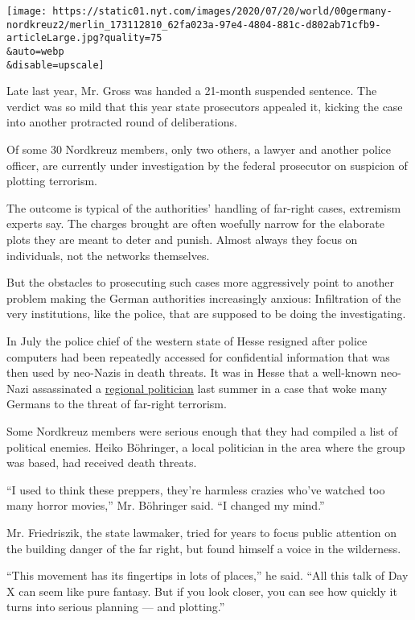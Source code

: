 \texttt{[image: https://static01.nyt.com/images/2020/07/20/world/00germany-nordkreuz2/merlin\_173112810\_62fa023a-97e4-4804-881c-d802ab71cfb9-articleLarge.jpg?quality=75\\\&auto=webp\\\&disable=upscale]}

Late last year, Mr. Gross was handed a 21-month suspended sentence. The
verdict was so mild that this year state prosecutors appealed it,
kicking the case into another protracted round of deliberations.

Of some 30 Nordkreuz members, only two others, a lawyer and another
police officer, are currently under investigation by the federal
prosecutor on suspicion of plotting terrorism.

The outcome is typical of the authorities' handling of far-right cases,
extremism experts say. The charges brought are often woefully narrow for
the elaborate plots they are meant to deter and punish. Almost always
they focus on individuals, not the networks themselves.

But the obstacles to prosecuting such cases more aggressively point to
another problem making the German authorities increasingly anxious:
Infiltration of the very institutions, like the police, that are
supposed to be doing the investigating.

In July the police chief of the western state of Hesse resigned after
police computers had been repeatedly accessed for confidential
information that was then used by neo-Nazis in death threats. It was in
Hesse that a well-known neo-Nazi assassinated a
\href{https://www.nytimes.com/2019/06/26/world/europe/germany-walter-lubcke-neo-nazi.html?searchResultPosition=8}{regional
politician} last summer in a case that woke many Germans to the threat
of far-right terrorism.

Some Nordkreuz members were serious enough that they had compiled a list
of political enemies. Heiko Böhringer, a local politician in the area
where the group was based, had received death threats.

``I used to think these preppers, they're harmless crazies who've
watched too many horror movies,'' Mr. Böhringer said. ``I changed my
mind.''

Mr. Friedriszik, the state lawmaker, tried for years to focus public
attention on the building danger of the far right, but found himself a
voice in the wilderness.

``This movement has its fingertips in lots of places,'' he said. ``All
this talk of Day X can seem like pure fantasy. But if you look closer,
you can see how quickly it turns into serious planning --- and
plotting.''

